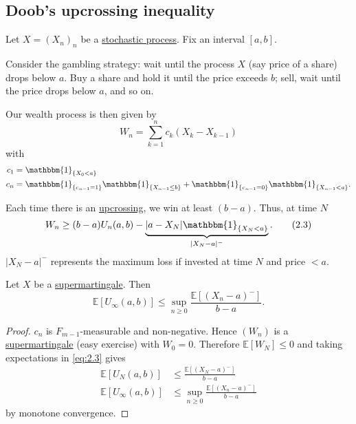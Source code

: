 \documentclass{article}
\newcommand{\1}[1]{\mathbbm{1}_{#1}}
\newcommand{\E}{\mathbb{E}}
\begin{document}
\subsection{Doob's upcrossing inequality}
Let $X = (X_n)_n$ be a \hyperlink{def:stoch}{stochastic process}. Fix an interval $[a,b]$.

Consider the gambling strategy: wait until the process $X$ (say price of a share) drops below $a$. Buy a share and hold it until the price exceeds $b$; sell, wait until the price drops below $a$, and so on.

Our wealth process is then given by
\begin{equation*}
  W_n = \sum_{k=1}^n c_k (X_k - X_{k-1})
\end{equation*}
with
\begin{align*}
  c_1 &= \1{\{X_0 < a\}} \\
  c_n &= \1{\{c_{n-1} = 1\}} \1{\{X_{n-1} \leq b\}} + \1{\{c_{n-1} = 0\}} \1{\{X_{n-1} < a\}}
.\end{align*}

Each time there is an \hyperlink{def:upcrossing}{upcrossing}, we win at least $(b-a)$. Thus, at time $N$
\begin{equation}
  W_n \geq (b-a) U_n(a,b) - \underbrace{|a - X_N| \1{\{X_N < a\}}}_{|X_N - a|^-}. \tag{2.3} \label{eq:2.3}
\end{equation}
$|X_N - a|^-$ represents the maximum loss if invested at time $N$ and price $< a$.
\begin{nthm}\label{thm:2.9}
  Let $X$ be a \hyperlink{def:martingale}{supermartingale}. Then
  \begin{equation*}
    \E[U_\infty (a,b)] \leq \sup_{n \geq 0} \frac{\E[(X_n - a)^-]}{b-a}
  .\end{equation*}
\end{nthm}
\begin{proof}
  $c_n$ is $F_{m-1}$-measurable and non-negative.
  Hence $(W_n)$ is a \hyperlink{def:martingale}{supermartingale} (easy exercise) with $W_0 = 0$.
  Therefore $\E[W_N] \leq 0$ and taking expectations in \eqref{eq:2.3} gives
  \begin{align*}
    \E[U_N(a,b)] &\leq \frac{\E[(X_N-a)^-]}{b-a} \\
    \E[U_\infty(a,b)] &\leq \sup_{n \geq 0} \frac{\E[(X_n-a)^-]}{b-a}
  \end{align*}
  by monotone convergence.
\end{proof}
\end{document}
